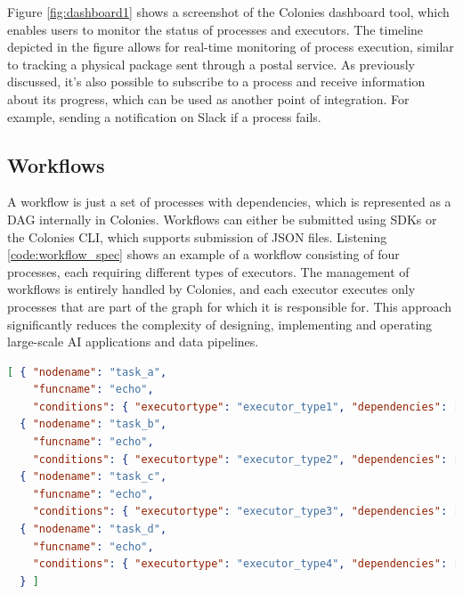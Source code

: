 \documentclass{article}
\begin{document}

Figure \ref{fig:dashboard1} shows a screenshot of the Colonies dashboard tool, which enables users to monitor the status of processes and executors. The timeline depicted in the figure allows for real-time monitoring of process execution, similar to tracking a physical package sent through a postal service. As previously discussed, it's also possible to subscribe to a process and receive information about its progress, which can be used as another point of integration. For example, sending a notification on Slack if a process fails.

\subsection{Workflows}
A workflow is just a set of processes with dependencies, which is represented as a DAG internally in Colonies. Workflows can either be submitted using SDKs or the Colonies CLI, which supports submission of JSON files. Listening \ref{code:workflow_spec} shows an example of a workflow consisting of four processes, each requiring different types of executors. The management of workflows is entirely handled by Colonies, and each executor executes only processes that are part of the graph for which it is responsible for. This approach significantly reduces the complexity of designing, implementing and operating large-scale AI applications and data pipelines. 

\begin{lstlisting}[basicstyle=\small, label=code:workflow_spec, language=json, basicstyle=\small, caption=Example of a workflow expressed in JSON.]
[ { "nodename": "task_a",
    "funcname": "echo",
    "conditions": { "executortype": "executor_type1", "dependencies": [] } },
  { "nodename": "task_b",
    "funcname": "echo",
    "conditions": { "executortype": "executor_type2", "dependencies": ["task_a"] } },
  { "nodename": "task_c",
    "funcname": "echo",
    "conditions": { "executortype": "executor_type3", "dependencies": ["task_a"] } },
  { "nodename": "task_d",
    "funcname": "echo",
    "conditions": { "executortype": "executor_type4", "dependencies": ["task_b", "task_c"] }
  } ]
\end{lstlisting}
\end{document}
